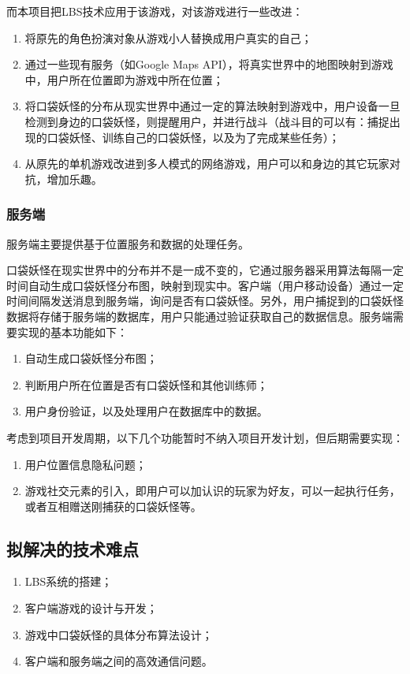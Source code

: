 \documentclass{article}
\begin{document}
\begin{CJK}{UTF8}{gbsn}
  而本项目把LBS技术应用于该游戏，对该游戏进行一些改进：
  
  \begin{enumerate}
    \item 将原先的角色扮演对象从游戏小人替换成用户真实的自己；
    \item 通过一些现有服务（如Google Maps API），将真实世界中的地图映射到游戏中，用户所在位置即为游戏中所在位置；
    \item 将口袋妖怪的分布从现实世界中通过一定的算法映射到游戏中，用户设备一旦检测到身边的口袋妖怪，则提醒用户，并进行战斗（战斗目的可以有：捕捉出现的口袋妖怪、训练自己的口袋妖怪，以及为了完成某些任务）；
    \item 从原先的单机游戏改进到多人模式的网络游戏，用户可以和身边的其它玩家对抗，增加乐趣。
  \end{enumerate}

  \subsubsection{服务端}

  服务端主要提供基于位置服务和数据的处理任务。

  口袋妖怪在现实世界中的分布并不是一成不变的，它通过服务器采用算法每隔一定时间自动生成口袋妖怪分布图，映射到现实中。客户端（用户移动设备）通过一定时间间隔发送消息到服务端，询问是否有口袋妖怪。另外，用户捕捉到的口袋妖怪数据将存储于服务端的数据库，用户只能通过验证获取自己的数据信息。服务端需要实现的基本功能如下：

  \begin{enumerate}
    \item 自动生成口袋妖怪分布图；
    \item 判断用户所在位置是否有口袋妖怪和其他训练师；
    \item 用户身份验证，以及处理用户在数据库中的数据。
  \end{enumerate}

  考虑到项目开发周期，以下几个功能暂时不纳入项目开发计划，但后期需要实现：
  \begin{enumerate}
    \item 用户位置信息隐私问题；
    \item 游戏社交元素的引入，即用户可以加认识的玩家为好友，可以一起执行任务，或者互相赠送刚捕获的口袋妖怪等。
  \end{enumerate}


  \subsection{拟解决的技术难点}
  \begin{enumerate}
    \item LBS系统的搭建；
    \item 客户端游戏的设计与开发；
    \item 游戏中口袋妖怪的具体分布算法设计；
    \item 客户端和服务端之间的高效通信问题。
  \end{enumerate}


\end{CJK}
\end{document}
